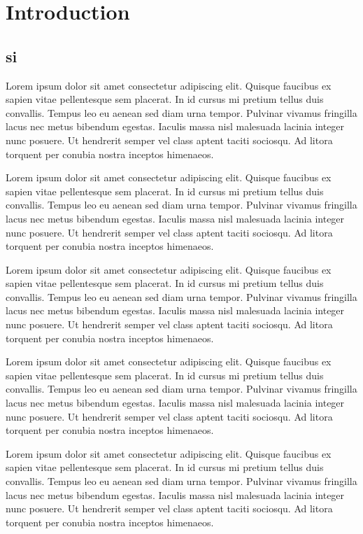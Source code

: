 \section{\LARGE Introduction}
\subsection{si}
Lorem ipsum dolor sit amet consectetur adipiscing elit. Quisque faucibus ex sapien vitae pellentesque sem placerat. In id cursus mi pretium tellus duis convallis. Tempus leo eu aenean sed diam urna tempor. Pulvinar vivamus fringilla lacus nec metus bibendum egestas. Iaculis massa nisl malesuada lacinia integer nunc posuere. Ut hendrerit semper vel class aptent taciti sociosqu. Ad litora torquent per conubia nostra inceptos himenaeos.

Lorem ipsum dolor sit amet consectetur adipiscing elit. Quisque faucibus ex sapien vitae pellentesque sem placerat. In id cursus mi pretium tellus duis convallis. Tempus leo eu aenean sed diam urna tempor. Pulvinar vivamus fringilla lacus nec metus bibendum egestas. Iaculis massa nisl malesuada lacinia integer nunc posuere. Ut hendrerit semper vel class aptent taciti sociosqu. Ad litora torquent per conubia nostra inceptos himenaeos.

Lorem ipsum dolor sit amet consectetur adipiscing elit. Quisque faucibus ex sapien vitae pellentesque sem placerat. In id cursus mi pretium tellus duis convallis. Tempus leo eu aenean sed diam urna tempor. Pulvinar vivamus fringilla lacus nec metus bibendum egestas. Iaculis massa nisl malesuada lacinia integer nunc posuere. Ut hendrerit semper vel class aptent taciti sociosqu. Ad litora torquent per conubia nostra inceptos himenaeos.

Lorem ipsum dolor sit amet consectetur adipiscing elit. Quisque faucibus ex sapien vitae pellentesque sem placerat. In id cursus mi pretium tellus duis convallis. Tempus leo eu aenean sed diam urna tempor. Pulvinar vivamus fringilla lacus nec metus bibendum egestas. Iaculis massa nisl malesuada lacinia integer nunc posuere. Ut hendrerit semper vel class aptent taciti sociosqu. Ad litora torquent per conubia nostra inceptos himenaeos.

Lorem ipsum dolor sit amet consectetur adipiscing elit. Quisque faucibus ex sapien vitae pellentesque sem placerat. In id cursus mi pretium tellus duis convallis. Tempus leo eu aenean sed diam urna tempor. Pulvinar vivamus fringilla lacus nec metus bibendum egestas. Iaculis massa nisl malesuada lacinia integer nunc posuere. Ut hendrerit semper vel class aptent taciti sociosqu. Ad litora torquent per conubia nostra inceptos himenaeos.

